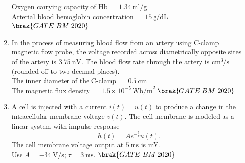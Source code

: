 \documentclass[journal,12pt,onecolumn]{IEEEtran}
\theoremstyle{remark}
\begin{document}
\begin{enumerate}
Oxygen carrying capacity of Hb $= 1.34 \ \text{ml/g}$\\

Arterial blood hemoglobin concentration $= 15 \ \text{g/dL}$  \hfill $\brak{GATE\ BM\ 2020}$\\

\item In the process of measuring blood flow from an artery using C-clamp magnetic 
flow probe, the voltage recorded across diametrically opposite sites of the artery 
is $3.75 \ \text{nV}$. The blood flow rate through the artery is  \underline{\hspace{2cm}}$\text{cm}^3/\text{s}$ 
(rounded off to two decimal places).\\

The inner diameter of the C-clamp $= 0.5 \ \text{cm}$\\

The magnetic flux density $= 1.5 \times 10^{-5} \ \text{Wb/m}^2$
 \hfill $\brak{GATE\ BM\ 2020}$\\
 
\item A cell is injected with a current $i(t) = u(t)$ to produce a change in the 
intracellular membrane voltage $v(t)$. The cell-membrane is modeled as a 
linear system with impulse response 
\[
h(t) = A e^{-\frac{t}{\tau}} u(t).
\]
The cell membrane voltage output at $5 \ \text{ms}$ is \underline{\hspace{2cm}} mV.\\

Use $A = -34 \ \text{V/s}$; $\tau = 3 \ \text{ms}$.  \hfill $\brak{GATE\ BM\ 2020}$\\

\newpage
{}


\end{enumerate}
\end{document}
